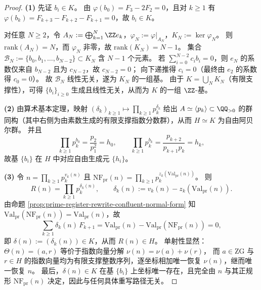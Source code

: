 \begin{proof}
\textbf{(1)} 先证 \(b_i\in K\)。
由 \(\varphi(b_0)=F_3-2F_2=0\)，且对 \(k\ge 1\) 有 \(\varphi(b_k)=F_{k+3}-F_{k+2}-F_{k+1}=0\)，故 \(b_i\in K\)。

对任意 \(N\ge 2\)，令 \(A_N:=\bigoplus_{k=1}^N\ZZ e_k\)，\(\varphi_N:=\varphi|_{A_N}\)，\(K_N:=\ker\varphi_N\)。
则 \(\mathrm{rank}(A_N)=N\)，而 \(\varphi_N\) 非零，故 \(\mathrm{rank}(K_N)=N-1\)。
集合
\(
\mathcal B_N:=\{b_0,b_1,\dots,b_{N-2}\}\subset K_N
\)
含 \(N-1\) 个元素。
若 \(\sum_{i=0}^{N-2} c_i b_i=0\)，则 \(e_N\) 的系数仅来自 \(b_{N-2}\) 且为 \(c_{N-2}\)，故 \(c_{N-2}=0\)；
向下递推得 \(c_i=0\)（最终由 \(e_2\) 的系数得 \(c_0=0\)）。
故 \(\mathcal B_N\) 线性无关，遂为 \(K_N\) 的一组基。
由于 \(K=\bigcup_N K_N\)（有限支撑性），可得 \(\{b_i\}_{i\ge 0}\) 生成且线性无关，从而为 \(K\) 的一组 \(\ZZ\)-基。

\textbf{(2)} 由算术基本定理，映射
\(
(\delta_k)_{k\ge 1}\mapsto \prod_{k\ge 1}p_k^{\delta_k}
\)
给出 \(A\simeq \langle p_k\rangle\subset\QQ_{>0}\) 的群同构（其中右侧为由素数生成的有限支撑指数分数群），从而 \(H\simeq K\) 为自由阿贝尔群。
并且
\[
\prod_{k\ge 1} p_k^{b_0}=\frac{p_2}{p_1^2}=h_0,\qquad
\prod_{k\ge 1} p_k^{b_k}=\frac{p_{k+2}}{p_{k+1}p_k}=h_k,
\]
故基 \(\{b_i\}\) 在 \(H\) 中对应自由生成元 \(\{h_i\}\)。

\textbf{(3)} 令
\(
n=\prod_{k\ge 1} p_k^{v_k(n)}
\)
且
\(
\mathrm{NF}_{\mathrm{pr}}(n)=\prod_{k\ge 1} p_k^{z_k(\mathrm{Val}_{\mathrm{pr}}(n))}
\)。
则
\[
R(n)=\prod_{k\ge 1} p_k^{\delta_k(n)},\qquad
\delta_k(n):=v_k(n)-z_k(\mathrm{Val}_{\mathrm{pr}}(n)).
\]
由命题 \ref{prop:prime-register-rewrite-confluent-normal-form} 知
\(\mathrm{Val}_{\mathrm{pr}}(\mathrm{NF}_{\mathrm{pr}}(n))=\mathrm{Val}_{\mathrm{pr}}(n)\)，故
\[
\sum_{k\ge 1}\delta_k(n)\,F_{k+1}
=\mathrm{Val}_{\mathrm{pr}}(n)-\mathrm{Val}_{\mathrm{pr}}(\mathrm{NF}_{\mathrm{pr}}(n))
=0,
\]
即 \(\delta(n):=(\delta_k(n))\in K\)，从而 \(R(n)\in H\)。
单射性显然：\(\Theta(n)=(a,r)\) 等价于指数向量分解
\(
\nu(n)=\nu(a)+\nu(r)
\)，
而 \(a\in\mathrm{ZG}\) 与 \(r\in H\) 的指数向量均为有限支撑整数序列，逐坐标相加唯一恢复 \(\nu(n)\)，继而唯一恢复 \(n\)。
最后，\(\delta(n)\in K\) 在基 \(\{b_i\}\) 上坐标唯一存在，且完全由 \(n\) 与其正规形 \(\mathrm{NF}_{\mathrm{pr}}(n)\) 决定，因此与任何具体重写路径无关。
\end{proof}

